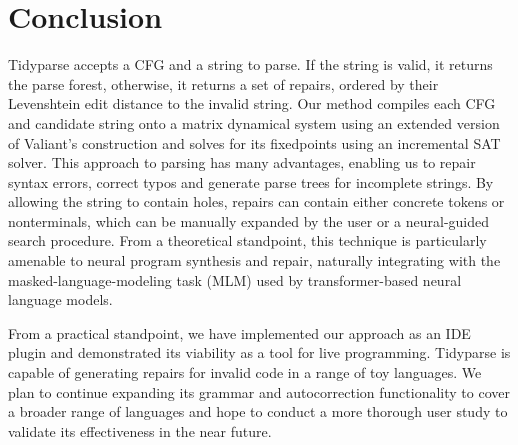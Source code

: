 \documentclass[sigplan,review,anonymous,acmsmall]{acmart}\settopmatter{printfolios=false,printccs=false,printacmref=false}
\begin{document}
\section{Conclusion}

Tidyparse accepts a CFG and a string to parse. If the string is valid, it returns the parse forest, otherwise, it returns a set of repairs, ordered by their Levenshtein edit distance to the invalid string. Our method compiles each CFG and candidate string onto a matrix dynamical system using an extended version of Valiant's construction and solves for its fixedpoints using an incremental SAT solver. This approach to parsing has many advantages, enabling us to repair syntax errors, correct typos and generate parse trees for incomplete strings. By allowing the string to contain holes, repairs can contain either concrete tokens or nonterminals, which can be manually expanded by the user or a neural-guided search procedure. From a theoretical standpoint, this technique is particularly amenable to neural program synthesis and repair, naturally integrating with the masked-language-modeling task (MLM) used by transformer-based neural language models.

From a practical standpoint, we have implemented our approach as an IDE plugin and demonstrated its viability as a tool for live programming. Tidyparse is capable of generating repairs for invalid code in a range of toy languages. We plan to continue expanding its grammar and autocorrection functionality to cover a broader range of languages and hope to conduct a more thorough user study to validate its effectiveness in the near future. %

\end{document}
